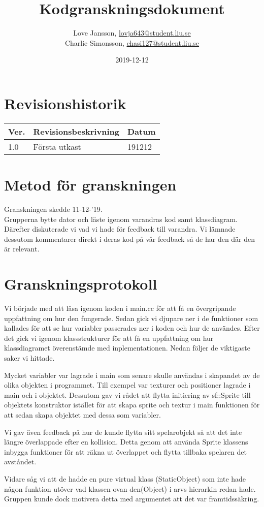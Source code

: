 \documentclass{TDP005mall}
\author{Love Jansson, \url{lovja643@student.liu.se}\\
  Charlie Simonsson, \url{chasi127@student.liu.se}}
\title{Kodgranskningsdokument}
\date{2019-12-12}
\begin{document}
\projectpage
\section{Revisionshistorik}
\begin{table}[!h]
\begin{tabularx}{\linewidth}{|l|X|l|}
\hline
Ver. & Revisionsbeskrivning & Datum \\\hline
1.0 & Första utkast & 191212 \\\hline
\end{tabularx}
\end{table}


\section{Metod för granskningen}
Granskningen skedde 11-12-'19.\\
Grupperna bytte dator och läste igenom varandras kod samt klassdiagram.
Därefter diskuterade vi vad vi hade för feedback till varandra. Vi lämnade
dessutom kommentarer direkt i deras kod på vår feedback så de har den där
den är relevant.

\section{Granskningsprotokoll}
Vi började med att läsa igenom koden i main.cc för att få en övergripande uppfattning om hur den fungerade. Sedan gick vi djupare ner i de funktioner som kallades för att  se hur variabler passerades ner i koden och hur de användes.
Efter det gick vi igenom klassstrukturer för att få en uppfattning om hur klassdiagramet överenstämde med inplementationen. Nedan följer de viktigaste saker vi hittade.

Mycket variabler var lagrade i main som senare skulle användas i skapandet
av de olika objekten i programmet. Till exempel var texturer och positioner lagrade
i main och i objektet. Dessutom gav vi rådet att flytta initiering av sf::Sprite till objektets konstruktor istället
för att skapa sprite och textur i main funktionen för att sedan skapa objektet
med dessa som variabler.

Vi gav även feedback på hur de kunde flytta sitt spelarobjekt så att det inte
längre överlappade efter en kollision. Detta genom att använda Sprite klassens
inbygga funktioner för att räkna ut överlappet och flytta tillbaka spelaren
det avståndet.

Vidare såg vi att de hadde en pure virtual klass (StaticObject) som inte hade
någon funktion utöver vad klassen ovan den(Object) i arvs hierarkin redan hade.
Gruppen kunde dock motivera detta med argumentet att det var framtidssäkring.
\end{document}
